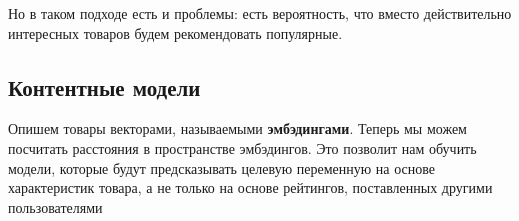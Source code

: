 Но в таком подходе есть и проблемы: есть вероятность, что вместо действительно интересных товаров будем рекомендовать популярные.

\subsection{Контентные модели}

Опишем товары векторами, называемыми \textbf{эмбэдингами}. Теперь мы можем посчитать расстояния в пространстве эмбэдингов. 
Это позволит нам обучить модели, которые будут предсказывать целевую переменную на основе характеристик товара, а не только на основе рейтингов, поставленных другими пользователями
